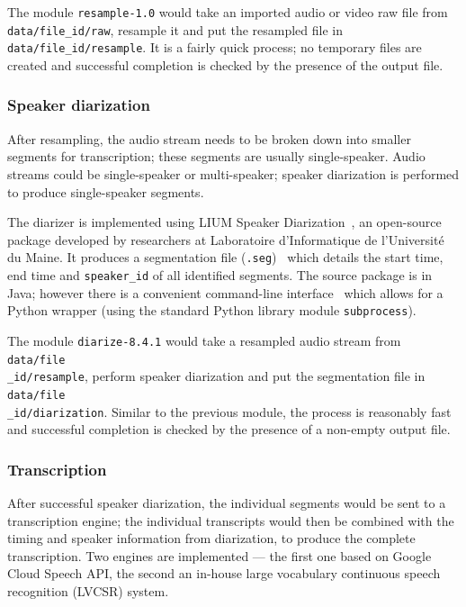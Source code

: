The module \texttt{resample-1.0} would take an imported audio or video raw file
from \texttt{data/file\_id/raw}, resample it and put the resampled file in
\texttt{data/file\_id/resample}. It is a fairly quick process; no temporary files
are created and successful completion is checked by the presence of the output file.

\subsubsection{Speaker diarization}

After resampling, the audio stream needs to be broken down into smaller segments
for transcription; these segments are usually single-speaker. Audio streams could
be single-speaker or multi-speaker; speaker diarization is performed to produce
single-speaker segments.

The diarizer is implemented using LIUM Speaker Diarization~\cite{lium}, an
open-source package developed by researchers at Laboratoire d'Informatique de
l'Université du Maine. It produces a segmentation file 
(\texttt{.seg})~\cite{lium-seg} which details the start time, end time and
\texttt{speaker\_id} of all identified segments. The source package is in Java;
however there is a convenient command-line interface~\cite{lium} which allows
for a Python wrapper (using the standard Python library module
\texttt{subprocess}).

The module \texttt{diarize-8.4.1} would take a resampled audio stream from
\texttt{data/file\\ \_id/resample}, perform speaker diarization and put the
segmentation file in \texttt{data/file\\ \_id/diarization}. Similar to the
previous module, the process is reasonably fast and successful completion is
checked by the presence of a non-empty output file.

\subsubsection{Transcription}

After successful speaker diarization, the individual segments would be sent
to a transcription engine; the individual transcripts would then be combined
with the timing and speaker information from diarization, to produce the complete
transcription. Two engines are implemented --- the first one based on Google
Cloud Speech API, the second an in-house large vocabulary continuous speech
recognition (LVCSR) system.

